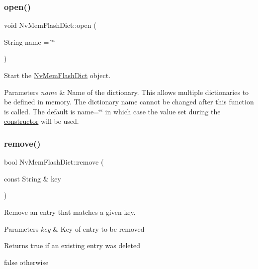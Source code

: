 \subsubsection{\texorpdfstring{open()}{open()}}
{\footnotesize\ttfamily void Nv\+Mem\+Flash\+Dict\+::open (\begin{DoxyParamCaption}\item[{String}]{name = {\ttfamily \char`\"{}\char`\"{}} }\end{DoxyParamCaption})}



Start the \mbox{\hyperlink{class_nv_mem_flash_dict}{Nv\+Mem\+Flash\+Dict}} object. 


\begin{DoxyParams}{Parameters}
{\em name} & Name of the dictionary. This allows multiple dictionaries to be defined in memory. The dictionary name cannot be changed after this function is called. The default is {\ttfamily name=\char`\"{}\char`\"{}} in which case the value set during the \mbox{\hyperlink{class_nv_mem_flash_dict}{constructor}} will be used. \\
\hline
\end{DoxyParams}
\mbox{\label{class_nv_mem_flash_dict_a1afddb8d0ae4cc6be96f83434763c26d}} 
\subsubsection{\texorpdfstring{remove()}{remove()}}
{\footnotesize\ttfamily bool Nv\+Mem\+Flash\+Dict\+::remove (\begin{DoxyParamCaption}\item[{const String \&}]{key }\end{DoxyParamCaption})\hspace{0.3cm}{\ttfamily [virtual]}}



Remove an entry that matches a given {\ttfamily key}. 


\begin{DoxyParams}{Parameters}
{\em key} & Key of entry to be removed \\
\hline
\end{DoxyParams}
\begin{DoxyReturn}{Returns}
true if an existing entry was deleted 

false otherwise 
\end{DoxyReturn}


